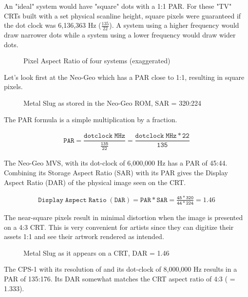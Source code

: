An "ideal" system would have "square" dots with a 1:1 PAR. For these "TV" CRTs built with a set physical scanline height, square pixels were guaranteed if the dot clock was 6,136,363 Hz ($\frac{135}{22}$). A system using a higher frequency would draw narrower dots while a system using a lower frequency would draw wider dots.

\begin{figure}[H]
\caption*{Pixel Aspect Ratio of four systems (exaggerated)}
\end{figure}


Let's look first at the Neo-Geo which has a PAR close to 1:1, resulting in square pixels\cite{par}.

\vfill
\begin{figure}[H]
\caption*{Metal Slug as stored in the Neo-Geo ROM, SAR = 320:224}
\end{figure}


The PAR formula is a simple multiplication by a fraction.

\begin{align*}
 \mathtt{PAR = \dfrac{dotclock\;MHz}{\frac{135}{22}} = \dfrac{dotclock\;MHz * 22}{135}}
\end{align*}

The Neo-Geo MVS, with its dot-clock of 6,000,000 Hz has a PAR of 45:44. Combining its  Storage Aspect Ratio (SAR) with its PAR gives the Display Aspect Ratio (DAR) of the physical image seen on the CRT.

\begin{align*}
 \mathtt{Display\;Aspect\;Ratio\;(DAR) = PAR * SAR = \frac{45*320}{44*224} = 1.46}
\end{align*}

The near-square pixels result in minimal distortion when the image is presented on a 4:3 CRT. This is very convenient for artists since they can digitize their assets 1:1 and see their artwork rendered as intended.

\vfill
\begin{figure}[H]
\caption*{Metal Slug as it appears on a CRT, DAR = 1.46}
\end{figure}





The CPS-1 with its resolution of  and its dot-clock of 8,000,000 Hz results in a PAR of 135:176. Its DAR somewhat matches the CRT aspect ratio of 4:3 ( = 1.333). 

